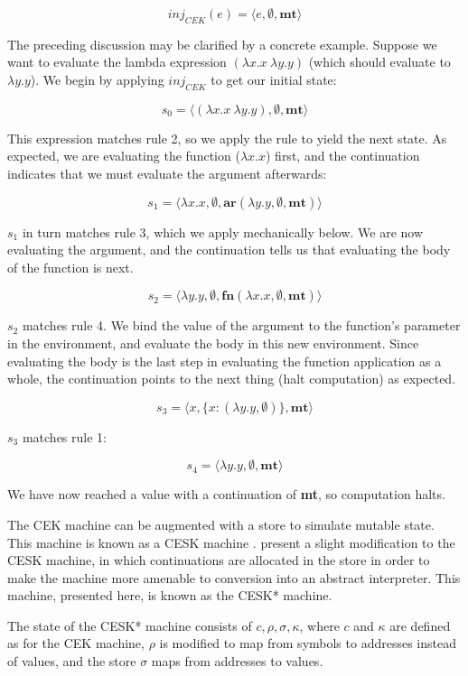 \documentclass{article}
\begin{document}
$$ inj_{CEK}(e) = \langle e, \emptyset, \textbf{mt} \rangle $$

The preceding discussion may be clarified by a concrete example. Suppose we want to evaluate the lambda expression $(\lambda x.x\ \lambda y.y)$ (which should evaluate to $\lambda y.y$). We begin by applying $inj_{CEK}$ to get our initial state:

$$ s_0 = \langle (\lambda x.x\ \lambda y.y), \emptyset, \textbf{mt} \rangle $$

This expression matches rule 2, so we apply the rule to yield the next state. As expected, we are evaluating the function ($\lambda x.x$) first, and the continuation indicates that we must evaluate the argument afterwards:

$$ s_1 = \langle \lambda x.x, \emptyset, \textbf{ar}(\lambda y.y, \emptyset, \textbf{mt}) \rangle $$

$s_1$ in turn matches rule 3, which we apply mechanically below. We are now evaluating the argument, and the continuation tells us that evaluating the body of the function is next.

$$ s_2 = \langle \lambda y.y, \emptyset, \textbf{fn}(\lambda x.x, \emptyset, \textbf{mt}) \rangle $$

$s_2$ matches rule 4. We bind the value of the argument to the function's parameter in the environment, and evaluate the body in this new environment. Since evaluating the body is the last step in evaluating the function application as a whole, the continuation points to the next thing (halt computation) as expected.

$$ s_3 = \langle x, \{ x: (\lambda y.y, \emptyset) \}, \textbf{mt} \rangle $$

$s_3$ matches rule 1:

$$ s_4 = \langle \lambda y.y, \emptyset, \textbf{mt} \rangle $$

We have now reached a value with a continuation of \textbf{mt}, so computation halts.

The CEK machine can be augmented with a store to simulate mutable state. This machine is known as a CESK machine \cite{cesk}. \cite{aam} present a slight modification to the CESK machine, in which continuations are allocated in the store in order to make the machine more amenable to conversion into an abstract interpreter. This machine, presented here, is known as the CESK* machine.

The state of the CESK* machine consists of $c, \rho, \sigma, \kappa$, where $c$ and $\kappa$ are defined as for the CEK machine, $\rho$ is modified to map from symbols to addresses instead of values, and the store $\sigma$ maps from addresses to values.
\end{document}
